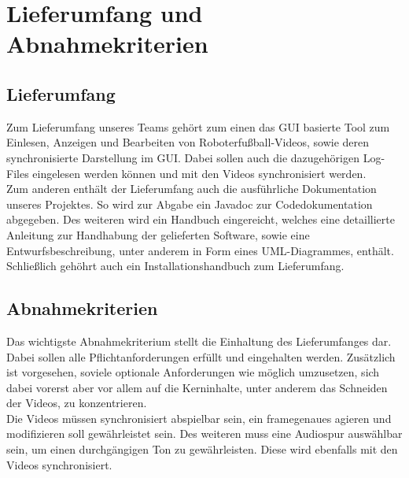 \chapter{Lieferumfang und Abnahmekriterien}

\section{Lieferumfang}
Zum Lieferumfang unseres Teams gehört zum einen das GUI basierte Tool zum Einlesen, Anzeigen und Bearbeiten von Roboterfußball-Videos, sowie deren synchronisierte Darstellung im GUI. Dabei sollen auch die dazugehörigen Log-Files eingelesen werden können und mit den Videos synchronisiert werden.
\\Zum anderen enthält der Lieferumfang auch die ausführliche Dokumentation unseres Projektes. 
So wird zur Abgabe ein Javadoc zur Codedokumentation abgegeben. 
Des weiteren wird ein Handbuch eingereicht, welches eine detaillierte Anleitung zur Handhabung der gelieferten Software, sowie eine Entwurfsbeschreibung, unter anderem in Form eines UML-Diagrammes, enthält.
Schließlich gehöhrt auch ein Installationshandbuch zum Lieferumfang. 

\section{Abnahmekriterien}
Das wichtigste Abnahmekriterium stellt die Einhaltung des Lieferumfanges dar. 
Dabei sollen alle Pflichtanforderungen erfüllt und eingehalten werden. Zusätzlich ist vorgesehen, soviele optionale Anforderungen wie möglich umzusetzen, sich dabei vorerst aber vor allem auf die Kerninhalte, unter anderem das Schneiden der Videos, zu konzentrieren.\\
Die Videos müssen synchronisiert abspielbar sein, ein framegenaues agieren und modifizieren soll gewährleistet sein. Des weiteren muss eine Audiospur auswählbar sein, um einen durchgängigen Ton zu gewährleisten. Diese wird ebenfalls mit den Videos synchronisiert.